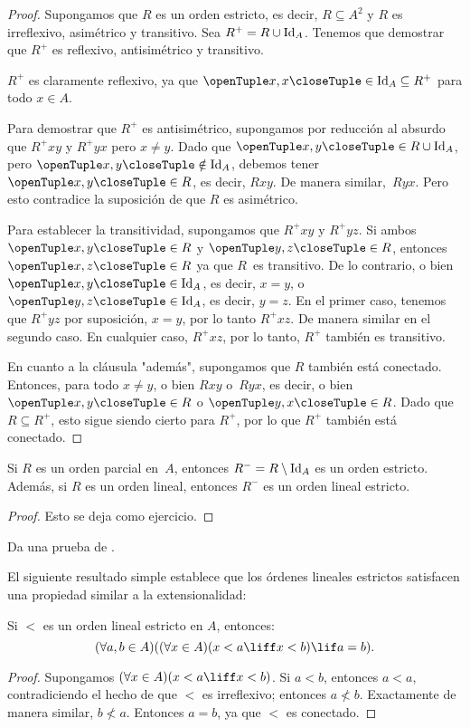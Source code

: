 \documentclass[../../../include/open-logic-section]{subfiles}
\begin{document}
\begin{proof}
Supongamos que $R$ es un orden estricto, es decir, $R \subseteq A^2$ y $R$ es irreflexivo, asimétrico y transitivo. Sea $R^+ = R \cup \mathord{\mathrm{Id}_{A}}$. Tenemos que demostrar que $R^+$ es reflexivo, antisimétrico y transitivo.

$R^+$ es claramente reflexivo, ya que $\tuple{x, x} \in \Id{A} \subseteq R^+$ para todo $x \in A$.

Para demostrar que $R^+$ es antisimétrico, supongamos por reducción al absurdo que $R^+xy$ y $R^+yx$ pero $x \neq y$. Dado que $\tuple{x,y} \in R \cup \Id{A}$, pero $\tuple{x, y} \notin \Id{A}$, debemos tener $\tuple{x, y} \in R$, es decir, $Rxy$. De manera similar,~$Ryx$. Pero esto contradice la suposición de que $R$ es asimétrico.

Para establecer la transitividad, supongamos que $R^+xy$ y $R^+yz$. Si ambos $\tuple{x, y} \in R$ y $\tuple{y,z} \in R$, entonces $\tuple{x, z} \in R$ ya que $R$~es transitivo. De lo contrario, o bien $\tuple{x, y} \in \Id{A}$, es decir, $x = y$, o $\tuple{y, z} \in \Id{A}$, es decir, $y = z$. En el primer caso, tenemos que $R^+yz$ por suposición, $x = y$, por lo tanto $R^+xz$. De manera similar en el segundo caso. En cualquier caso, $R^+xz$, por lo tanto, $R^+$ también es transitivo.

En cuanto a la cláusula "además", supongamos que $R$ también está conectado. Entonces, para todo $x \neq y$, o bien $Rxy$ o~$Ryx$, es decir, o bien $\tuple{x, y} \in R$ o $\tuple{y, x} \in R$. Dado que $R \subseteq R^+$, esto sigue siendo cierto para $R^+$, por lo que $R^+$ también está conectado.
\end{proof}

\begin{prop}
Si $R$ es un orden parcial en~$A$, entonces $R^- = R \setminus \mathord{\mathrm{Id}_{A}}$ es un orden estricto. Además, si $R$ es un orden lineal, entonces $R^-$ es un orden lineal estricto.
\end{prop}

\begin{proof}
Esto se deja como ejercicio.
\end{proof}

\begin{prob}
Da una prueba de .
\end{prob}

El siguiente resultado simple establece que los órdenes lineales estrictos satisfacen una propiedad similar a la extensionalidad:

\begin{prop}
Si $<$ es un orden lineal estricto en $A$, entonces:
\[
(\forall a, b \in A)((\forall x \in A)(x < a \liff x < b) \lif a = b).
\]
\end{prop}

\begin{proof}
Supongamos $(\forall x \in A)(x < a \liff x < b)$. Si $a < b$, entonces $a < a$, contradiciendo el hecho de que $<$ es irreflexivo; entonces $a \nless b$. Exactamente de manera similar, $b \nless a$. Entonces $a = b$, ya que $<$ es conectado.
\end{proof}
\end{document}
